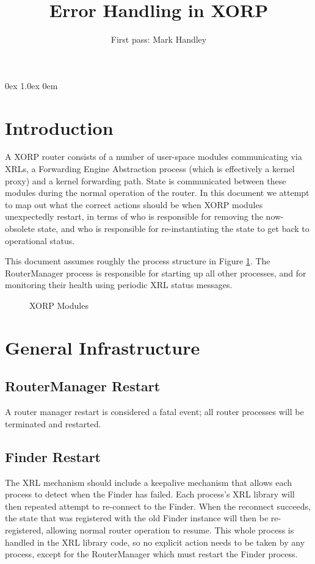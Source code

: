 \documentclass[11pt]{article}
\title{Error Handling in XORP}
\author{First pass: Mark Handley}
\begin{document}
\parsep 0ex
\parskip 1.0ex
\parindent 0em
\noindent
\maketitle                            
\section{Introduction}
A XORP router consists of a number of user-space modules communicating
via XRLs, a Forwarding Engine Abstraction process (which is
effectively a kernel proxy) and a kernel forwarding path.  State is
communicated between these modules during the normal operation of the
router.  In this document we attempt to map out what the correct
actions should be when XORP modules unexpectedly restart, in terms of
who is responsible for removing the now-obsolete state, and who is
responsible for re-instantiating the state to get back to operational
status.

This document assumes roughly the process structure in Figure
\ref{modules}.  The RouterManager process is responsible for starting
up all other processes, and for monitoring their health using periodic
XRL status messages.

\begin{figure}[htb]
\centerline{}  
\caption{XORP Modules}
\label{modules}
\end{figure}

\section{General Infrastructure}

\subsection{RouterManager Restart}
A router manager restart is considered a fatal event; all router
processes will be terminated and restarted.

\subsection{Finder Restart}
The XRL mechanism should include a keepalive mechanism that allows
each process to detect when the Finder has failed.  Each process's XRL
library will then repeated attempt to re-connect to the Finder.  When
the reconnect succeeds, the state that was registered with the old
Finder instance will then be re-registered, allowing normal router
operation to resume.  This whole process is handled in the XRL library
code, so no explicit action needs to be taken by any process, except
for the RouterManager which must restart the Finder process.
\end{document}
